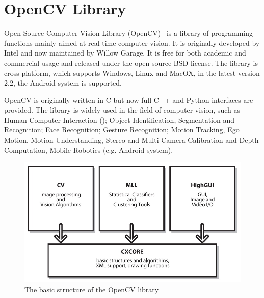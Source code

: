 \section{OpenCV Library}
\label{sec:opencv}

Open Source Computer Vision Library (OpenCV)~\cite{opencv} is a library of
programming functions mainly aimed at real time computer vision. It is
originally developed by Intel and now maintained by Willow Garage. It
is free for both academic and commercial usage and released  under the
open source BSD license. The library is cross-platform, which supports
Windows, Linux and MacOX,  in the latest version 2.2, the Android
system is supported.

OpenCV is originally written in C but now full C++ and Python
interfaces are provided. The library is widely used in the field of
computer vision, such as Human-Computer Interaction (); Object
Identification, Segmentation and Recognition; Face Recognition;
Gesture Recognition; Motion Tracking, Ego Motion, Motion
Understanding, Stereo and Multi-Camera
Calibration and Depth Computation, Mobile Robotics (e.g. Android
system).

\begin{figure}[htbp]
  \centering
\includegraphics[width=\linewidth]{images/bsopencv.jpg}
  \caption[The basic structure of the OpenCV library]{The basic
    structure of the OpenCV library~\cite{bradski2008learning}}
  \label{fig:bsopencv}
\end{figure}

